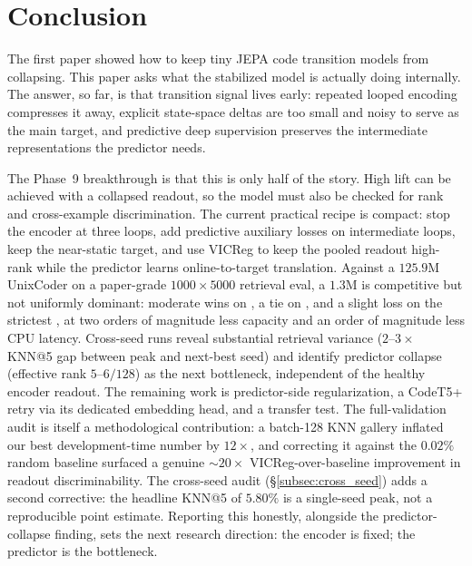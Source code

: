 \section{Conclusion}
\label{sec:conclusion}

The first \CodeWM{} paper showed how to keep tiny JEPA code transition
models from collapsing.  This paper asks what the stabilized model is
actually doing internally.  The answer, so far, is that transition signal
lives early: repeated looped encoding compresses it away, explicit
state-space deltas are too small and noisy to serve as the main target,
and predictive deep supervision preserves the intermediate
representations the predictor needs.

The Phase~9 breakthrough is that this is only half of the story.  High
lift can be achieved with a collapsed readout, so the model must also be
checked for rank and cross-example discrimination.  The current practical
recipe is compact: stop the encoder at three loops, add predictive
auxiliary losses on intermediate loops, keep the near-static target, and
use VICReg to keep the pooled readout high-rank while the predictor
learns online-to-target translation.  Against a $125.9$M UnixCoder on a
paper-grade $1000\times5000$ retrieval eval, a $1.3$M \CodeWM{} is
competitive but not uniformly dominant: moderate wins on
, a tie on , and a slight loss on the
strictest , at two orders of magnitude less capacity and
an order of magnitude less CPU latency.  Cross-seed runs reveal substantial retrieval variance
($2\text{--}3\times$ KNN@5 gap between peak and next-best seed) and
identify predictor collapse (effective rank $5\text{--}6/128$) as the
next bottleneck, independent of the healthy encoder readout.  The
remaining work is predictor-side regularization, a CodeT5+ retry via
its dedicated embedding head, and a \KernelWM{} transfer test.  The
full-validation
audit is itself a methodological contribution: a batch-128 KNN gallery
inflated our best development-time number by $12\times$, and correcting
it against the $0.02\%$ random baseline surfaced a genuine
$\sim\!20\times$ VICReg-over-baseline improvement in readout
discriminability.  The cross-seed audit (\S\ref{subsec:cross_seed})
adds a second corrective: the headline KNN@5 of $5.80\%$ is a
single-seed peak, not a reproducible point estimate.  Reporting this
honestly, alongside the predictor-collapse finding, sets the next
research direction: the encoder is fixed; the predictor is the
bottleneck.
